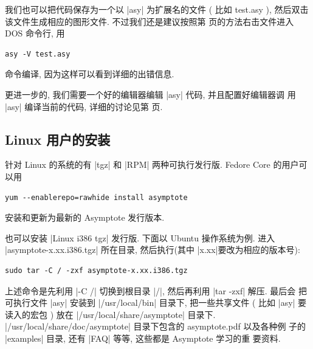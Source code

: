 \documentclass{ctexbook}
\begin{document}
我们也可以把代码保存为一个以 |asy| 为扩展名的文件 ( 比如 test.asy ),
然后双击该文件生成相应的图形文件. 不过我们还是建议按照第
\pageref{Windows:DOS} 页的方法右击文件进入 DOS 命令行, 用
\begin{verbatim}
asy -V test.asy
\end{verbatim}
命令编译, 因为这样可以看到详细的出错信息.

更进一步的, 我们需要一个好的编辑器编辑 |asy| 代码, 并且配置好编辑器调
用 |asy| 编译当前的代码, 详细的讨论见第 \pageref{asy:Editors} 页.

\subsection{Linux 用户的安装}
针对 Linux 的系统的有 |tgz| 和 |RPM| 两种可执行发行版.
Fedore Core 的用户可以用
\begin{verbatim}
yum --enablerepo=rawhide install asymptote
\end{verbatim}
安装和更新为最新的 Asymptote 发行版本.

也可以安装 |Linux i386 tgz| 发行版. 下面以
Ubuntu 操作系统为例. 进入 |asymptote-x.xx.i386.tgz| 所在目录,
然后执行(其中 |x.xx|要改为相应的版本号):

\begin{verbatim}
sudo tar -C / -zxf asymptote-x.xx.i386.tgz
\end{verbatim}
上述命令是先利用 |-C /| 切换到根目录 |/|, 然后再利用 |tar -zxf| 解压. 最后会
把可执行文件 |asy| 安装到 |/usr/local/bin| 目录下, 把一些共享文件
( 比如 |asy| 要读入的宏包 ) 放在 |/usr/local/share/asymptote| 目录下.
|/usr/local/share/doc/asymptote| 目录下包含的 asymptote.pdf 以及各种例
子的 |examples| 目录, 还有 |FAQ| 等等, 这些都是 Asymptote 学习的重
要资料.
\end{document}
